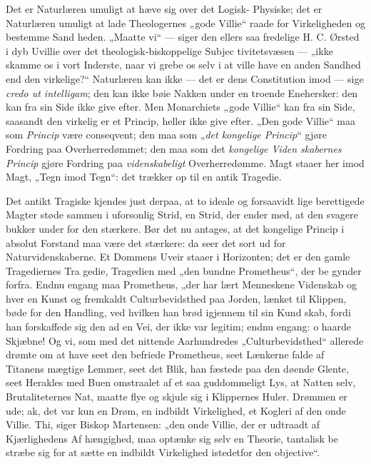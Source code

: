 \documentclass[12pt]{book}
\newcommand{\opage}[1]{\marginnote{\footnotesize\textit{[#1]}}}
\begin{document}
Det er Naturlæren umuligt at hæve sig over det Logisk-%
Physiske; det er Naturlæren umuligt at lade Theologernes
„gode Villie“ raade for Virkeligheden og bestemme Sand\-%
heden. „Maatte vi“ --- siger den ellers saa fredelige H. C.
Ørsted i dyb Uvillie over det theologisk-biskoppelige Subjec\-%
tivitetsvæsen --- „ikke skamme os i vort Inderste, naar vi
grebe os selv i at ville have en anden Sandhed end den
virkelige?“ Naturlæren kan ikke --- det er dens Constitution
imod --- sige \textit{credo ut intelligam}; den kan ikke bøie Nakken
under en troende Enehersker: den kan fra sin Side ikke give
efter. Men Monarchiets „gode Villie“ kan fra sin Side,
saasandt den virkelig er et Princip, heller ikke give efter.
„Den gode Villie“ maa som \emph{Princip} være conseqvent; den
maa som „\emph{det kongelige Princip}“ gjøre Fordring paa
Overherredømmet; den maa som det \emph{kongelige Viden\-%
skabernes Princip} gjøre Fordring paa \emph{videnskabeligt}
Overherredømme. Magt staaer her imod Magt, „Tegn imod
Tegn“: det trækker op til en antik Tragedie.

Det antikt Tragiske kjendes just derpaa, at to ideale og
forsaavidt lige berettigede Magter støde sammen i uforsonlig
Strid, en Strid, der ender med, at den svagere bukker under
for den stærkere. Bør det nu antages, at det kongelige
Princip i absolut Forstand maa være det stærkere: da seer
det sort ud for Naturvidenskaberne. Et Dommens Uveir
staaer i Horizonten; det er den gamle Tragediernes Tra\-%
gedie, Tragedien med „den bundne Prometheus“, der be\-%
gynder forfra. Endnu engang maa Prometheus, „der har
lært Menneskene Videnskab og hver en Kunst og fremkaldt
\opage{17}\setcounter{footnote}{0}%
Culturbevidsthed paa Jorden, lænket til Klippen, bøde for
den Handling, ved hvilken han brød igjennem til sin Kund\-%
skab, fordi han forskaffede sig den ad en Vei, der ikke var
legitim; %
endnu engang: o haarde Skjæbne! Og vi, som med
det nittende Aarhundredes „Culturbevidsthed“ allerede drømte
om at have seet den befriede Prometheus, seet Lænkerne falde
af Titanens mægtige Lemmer, seet det Blik, han fæstede paa
den døende Glente, seet Herakles med Buen omstraalet af et
saa guddommeligt Lys, at Natten selv, Brutaliteternes Nat,
maatte flye og skjule sig i Klippernes Huler. Drømmen
er ude; ak, det var kun en Drøm, en indbildt Virkelighed,
et Kogleri af den onde Villie. Thi, siger Biskop Martensen:
„den onde Villie, der er udtraadt af Kjærlighedens Af\-%
hængighed, maa optænke sig selv en Theorie, tantalisk be\-%
stræbe sig for at sætte en indbildt Virkelighed istedetfor den
objective“.
\end{document}
